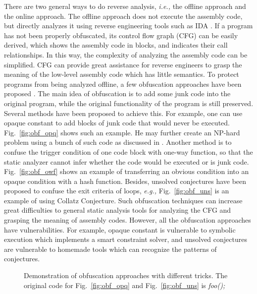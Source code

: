 \documentclass[10pt, conference]{IEEEtran}
\begin{document}
There are two general ways to do reverse analysis, \textit{i.e.,} the offline approach and the online approach.  The offline approach does not execute the assembly code, but directly analyzes it using reverse engineering tools such as IDA \cite{ida}.  If a program has not been properly obfuscated, its control flow graph (CFG) can be easily derived, which shows the assembly code in blocks, and indicates their call relationships.  In this way, the complexity of analyzing the assembly code can be simplified.  CFG can provide great assistance for reverse engineers to grasp the meaning of the low-level assembly code which has little semantics.  To protect programs from being analyzed offline, a few obfuscation approaches have been proposed \cite{zhangprogram}.  The main idea of obfuscation is to add some junk code into the original program, while the original functionality of the program is still preserved.  Several methods have been proposed to achieve this.  For example, one can use opaque constant to add blocks of junk code that would never be executed.  Fig.~\ref{fig:obf_opq} shows such an example.  He may further create an NP-hard problem using a bunch of such code as discussed in \cite{ogiso2003software}.  Another method is to confuse the trigger condition of one code block with one-way function, so that the static analyzer cannot infer whether the code would be executed or is junk code.  Fig.~\ref{fig:obf_owf} shows an example of transferring an obvious condition into an opaque condition with a hash function.  Besides, unsolved conjectures have been proposed to confuse the exit criteria of loops, \textit{e.g.,} Fig.~\ref{fig:obf_uns} is an example of using Collatz Conjecture.  Such obfuscation techniques can increase great difficulties to general static analysis tools for analyzing the CFG and grasping the meaning of assembly codes.  However, all the obfuscation approaches have vulnerabilities.  For example, opaque constant is vulnerable to symbolic execution which implements a smart constraint solver, and unsolved conjectures are vulnerable to homemade tools which can recognize the patterns of conjectures.  
\begin{figure}[thb]
\centering
{}
\hfill
{}
\caption{Demonstration of obfuscation approaches with different tricks. The original code for Fig.~\ref{fig:obf_opq} and Fig.~\ref{fig:obf_uns} is \textmd{\textit{foo();}}}
\end{figure}
\end{document}
